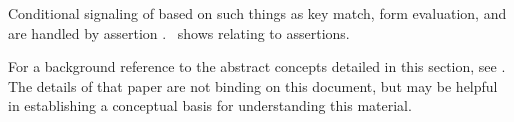Conditional signaling of 
based on such things as key match, form evaluation,
and  are handled by assertion .
\Thenextfigure\ shows  relating to assertions.

 
\endSubsection%

% 
% 
% 
% 



For a background reference to the abstract concepts detailed in this
section, see \CondSysPaper.  The details of that paper are not binding on
this document, but may be helpful in establishing a conceptual basis for
understanding this material.

\endsubsection%
